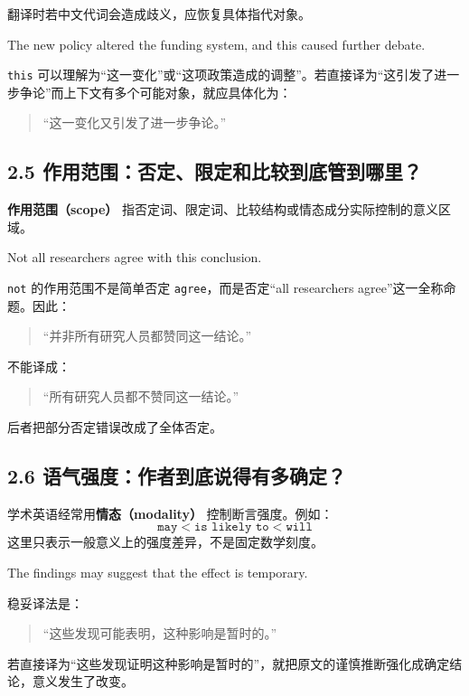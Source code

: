 \documentclass[11pt,a4paper]{ctexart}
\newcommand{\term}[2]{\textbf{#1（#2）}}
\begin{document}
翻译时若中文代词会造成歧义，应恢复具体指代对象。

\begin{eng}[例 6]
The new policy altered the funding system, and this caused further debate.
\end{eng}
\texttt{this} 可以理解为“这一变化”或“这项政策造成的调整”。若直接译为“这引发了进一步争论”而上下文有多个可能对象，就应具体化为：
\begin{quote}
“这一变化又引发了进一步争论。”
\end{quote}

\subsection{2.5 作用范围：否定、限定和比较到底管到哪里？}
\term{作用范围}{scope} 指否定词、限定词、比较结构或情态成分实际控制的意义区域。

\begin{eng}[例 7]
Not all researchers agree with this conclusion.
\end{eng}
\texttt{not} 的作用范围不是简单否定 \texttt{agree}，而是否定“all researchers agree”这一全称命题。因此：
\begin{quote}
“并非所有研究人员都赞同这一结论。”
\end{quote}
不能译成：
\begin{quote}
“所有研究人员都不赞同这一结论。”
\end{quote}
后者把部分否定错误改成了全体否定。

\subsection{2.6 语气强度：作者到底说得有多确定？}
学术英语经常用\term{情态}{modality} 控制断言强度。例如：
\[
\texttt{may} < \texttt{is likely to} < \texttt{will}
\]
这里只表示一般意义上的强度差异，不是固定数学刻度。

\begin{eng}[例 8]
The findings may suggest that the effect is temporary.
\end{eng}
稳妥译法是：
\begin{quote}
“这些发现可能表明，这种影响是暂时的。”
\end{quote}
若直接译为“这些发现证明这种影响是暂时的”，就把原文的谨慎推断强化成确定结论，意义发生了改变。
\end{document}
